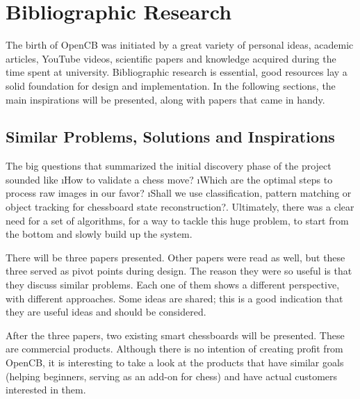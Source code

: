 \chapter{Bibliographic Research} \label{ch:studiubib} \pagestyle{fancy}

The birth of OpenCB was initiated by a great variety of personal ideas, academic articles, YouTube videos, scientific papers and knowledge acquired during the time spent at university. Bibliographic research is essential, good resources lay a solid foundation for design and implementation. In the following sections, the main inspirations will be presented, along with papers that came in handy.




\section{Similar Problems, Solutions and Inspirations} \label{sec:similar-problemns-solutions-and-inspirations}

The big questions that summarized the initial discovery phase of the project sounded like \i{How to validate a chess move?} \i{Which are the optimal steps to process raw images in our favor?} \i{Shall we use classification, pattern matching or object tracking for chessboard state reconstruction?}. Ultimately, there was a clear need for a set of algorithms, for a way to tackle this huge problem, to start from the bottom and slowly build up the system.

There will be three papers presented. Other papers were read as well, but these three served as pivot points during design. The reason they were so useful is that they discuss similar problems. Each one of them shows a different perspective, with different approaches. Some ideas are shared; this is a good indication that they are useful ideas and should be considered.

After the three papers, two existing smart chessboards will be presented. These are commercial products. Although there is no intention of creating profit from OpenCB, it is interesting to take a look at the products that have similar goals (helping beginners, serving as an add-on for chess) and have actual customers interested in them.


